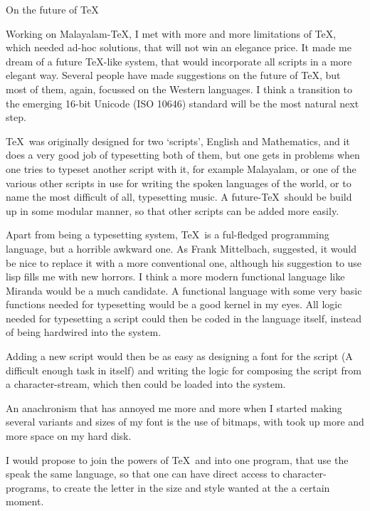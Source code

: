 

\beginsection On the future of \TeX

Working on Malayalam-\TeX, I met with more and more limitations of
\TeX, which needed ad-hoc solutions, that will not win an elegance
price. It made me dream of a future \TeX-like system, that would
incorporate all scripts in a more elegant way. Several people have
made suggestions on the future of \TeX, but most of them, again,
focussed on the Western languages. I think a transition to the
emerging 16-bit Unicode (ISO 10646) standard will be the most natural
next step.

\TeX\ was originally designed for two `scripts', English and
Mathematics, and it does a very good job of typesetting both of them,
but one gets in problems when one tries to typeset another script with
it, for example Malayalam, or one of the various other scripts in use
for writing the spoken languages of the world, or to name the most
difficult of all, typesetting music. A future-\TeX\ should be build up
in some modular manner, so that other scripts can be added more
easily.

Apart from being a typesetting system, \TeX\ is a ful-fledged
programming language, but a horrible awkward one. As Frank Mittelbach,
suggested, it would be nice to replace it with a more conventional
one, although his suggestion to use lisp fills me with new horrors. I
think a more modern functional language like Miranda would be a much
candidate. A functional language with some very basic functions needed
for typesetting would be a good kernel in my eyes. All logic needed
for typesetting a script could then be coded in the language itself,
instead of being hardwired into the system.

Adding a new script would then be as easy as designing a font for the
script (A difficult enough task in itself) and writing the logic for
composing the script from a character-stream, which then could be
loaded into the system.

An anachronism that has annoyed me more and more when I started making
several variants and sizes of my font is the use of bitmaps, with took
up more and more space on my hard disk.

I would propose to join the powers of \TeX\ and \MF into one program,
that use the speak the same language, so that one can have direct
access to character-programs, to create the letter in the size and
style wanted at the a certain moment.


\bye
